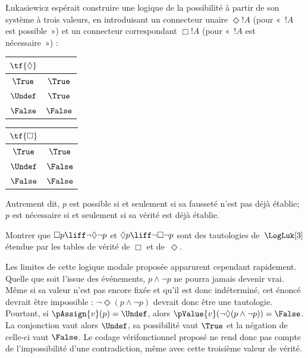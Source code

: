 \documentclass[../../../include/open-logic-section]{subfiles}
\begin{document}
\L ukasiewicz espérait construire
une logique de la possibilité à partir
de son système à trois valeurs, en
introduisant un connecteur unaire
$\Diamond !A$ (pour «~$!A$ est possible~»)
et un connecteur correspondant
$\Box !A$ (pour «~$!A$ est nécessaire~») :
\begin{center}
  \begin{tabular}{c|c}
    $\tf{\Diamond}$ & \\
    \hline
    $\True$ & $\True$ \\
    $\Undef$ & $\True$ \\
    $\False$ & $\False$
  \end{tabular}
  \quad
  \begin{tabular}{c|c}
    $\tf{\Box}$ & \\
    \hline
    $\True$ & $\True$ \\
    $\Undef$ & $\False$ \\
    $\False$ & $\False$
  \end{tabular}
\end{center}
Autrement dit, $p$ est possible si
et seulement si sa fausseté n'est
pas déjà établie; $p$ est nécessaire
si et seulement si sa vérité est déjà
établie.

\begin{prob}
  Montrer que
  $\Box p\liff\lnot\Diamond\lnot p$
  et $\Diamond p\liff\lnot\Box\lnot p$
  sont des tautologies de~$\LogLuk[3]$
  étendue par les tables de vérité de
  $\Box$ et de~$\Diamond$.
\end{prob}

Les limites de cette logique modale
proposée apparurent cependant rapidement.
Quelle que soit l'issue des événements,
$p\land\lnot p$ ne pourra jamais
devenir vrai. Même si sa valeur n'est
pas encore fixée et qu'il est donc
indéterminé, cet énoncé devrait être
impossible : $\lnot\Diamond
(p\land\lnot p)$ devrait donc être
une tautologie. Pourtant, si
$\pAssign{v}(p)=\Undef$, alors
$\pValue{v}(\lnot\Diamond
(p\land\lnot p))=\False$. La conjonction vaut alors $\Undef$,
sa possibilité vaut $\True$ et la négation de celle-ci vaut $\False$.
Le codage vérifonctionnel proposé ne rend donc pas compte de
l'impossibilité d'une contradiction, même avec cette troisième
valeur de vérité.
\end{document}
